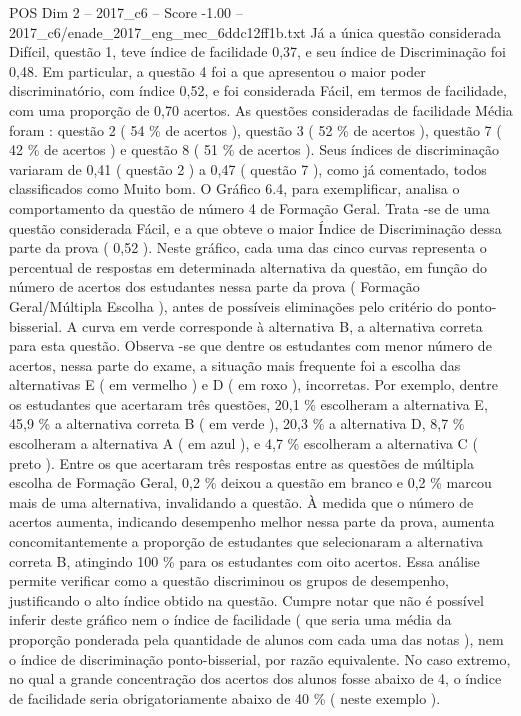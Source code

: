 \begin{textsample}{POS Dim 2 – 2017\_c6 – Score -1.00 – 2017\_c6/enade\_2017\_eng\_mec\_6ddc12ff1b.txt}
Já a única questão considerada Difícil, questão 1, teve índice de facilidade 0,37, e seu índice de Discriminação foi 0,48.
Em particular, a questão 4 foi a que apresentou o maior poder discriminatório, com índice 0,52, e foi considerada Fácil, em termos de facilidade, com uma proporção de 0,70 acertos.
As questões consideradas de facilidade Média foram : questão 2 ( 54 \% de acertos ), questão 3 ( 52 \% de acertos ), questão 7 ( 42 \% de acertos ) e questão 8 ( 51 \% de acertos ).
Seus índices de discriminação variaram de 0,41 ( questão 2 ) a 0,47 ( questão 7 ), como já comentado, todos classificados como Muito bom.
O Gráfico 6.4, para exemplificar, analisa o comportamento da questão de número 4 de Formação Geral.
Trata -se de uma questão considerada Fácil, e a que obteve o maior Índice de Discriminação dessa parte da prova ( 0,52 ).
Neste gráfico, cada uma das cinco curvas representa o percentual de respostas em determinada alternativa da questão, em função do número de acertos dos estudantes nessa parte da prova ( Formação Geral/Múltipla Escolha ), antes de possíveis eliminações pelo critério do ponto-bisserial.
A curva em verde corresponde à alternativa B, a alternativa correta para esta questão.
Observa -se que dentre os estudantes com menor número de acertos, nessa parte do exame, a situação mais frequente foi a escolha das alternativas E ( em vermelho ) e D ( em roxo ), incorretas.
Por exemplo, dentre os estudantes que acertaram três questões, 20,1 \% escolheram a alternativa E, 45,9 \% a alternativa correta B ( em verde ), 20,3 \% a alternativa D, 8,7 \% escolheram a alternativa A ( em azul ), e 4,7 \% escolheram a alternativa C ( preto ).
Entre os que acertaram três respostas entre as questões de múltipla escolha de Formação Geral, 0,2 \% deixou a questão em branco e 0,2 \% marcou mais de uma alternativa, invalidando a questão.
À medida que o número de acertos aumenta, indicando desempenho melhor nessa parte da prova, aumenta concomitantemente a proporção de estudantes que selecionaram a alternativa correta B, atingindo 100 \% para os estudantes com oito acertos.
Essa análise permite verificar como a questão discriminou os grupos de desempenho, justificando o alto índice obtido na questão.
Cumpre notar que não é possível inferir deste gráfico nem o índice de facilidade ( que seria uma média da proporção ponderada pela quantidade de alunos com cada uma das notas ), nem o índice de discriminação ponto-bisserial, por razão equivalente.
No caso extremo, no qual a grande concentração dos acertos dos alunos fosse abaixo de 4, o índice de facilidade seria obrigatoriamente abaixo de 40 \% ( neste exemplo ).

\end{textsample}

